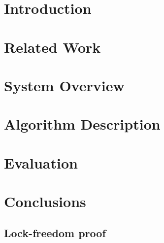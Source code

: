 \documentclass[11pt]{article}
\theoremstyle{plain}
\begin{document}
\section{Introduction}
\label{sec:intro}

\section{Related Work}
\label{sec:related}


\section{System Overview}
\label{sec:system}


\section{Algorithm Description}
\label{sec:algo}


\section{Evaluation}
\label{sec:evaluation}


\section{Conclusions}
\label{sec:conclusions}




\pagebreak \small

\begin{appendix}

\section{Lock-freedom proof}
\label{appendix:lock-freedom}

\end{appendix}
\end{document}
